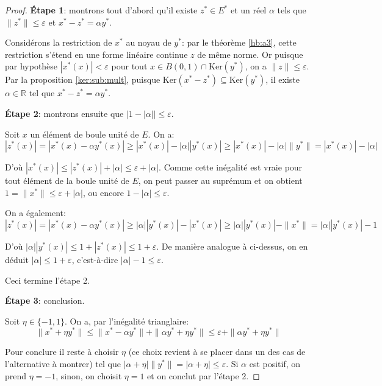 \begin{proof}
  \textbf{\'{E}tape 1}:
  montrons tout d'abord qu'il existe $z^*\in E^*$ et un réel $\alpha$ tels
  que $\|z^*\|\leq \varepsilon$ et $x^* - z^* = \alpha y^*$.

  Considérons la restriction de $x^*$ au noyau de $y^*$: par le
  théorème \ref{hb:a3}, cette restriction s'étend en une forme linéaire
  continue $z$ de même norme.
  Or puisque par hypothèse $|x^*(x)| < \varepsilon$ pour tout $x\in B(0, 1)
  \cap \mathrm{Ker}(y^*)$, on a $\|z\|\leq \varepsilon$. Par la proposition
  \ref{ker:sub:mult}, puisque $\mathrm{Ker}(x^* - z^*) \subseteq
  \mathrm{Ker}(y^*)$, il existe $\alpha \in\mathbb{R}$ tel que $x^*-z^* =
  \alpha y^*$.

  \textbf{\'{E}tape 2}: montrons ensuite que $|1- |\alpha||\leq \varepsilon$.


  Soit $x$ un élément de boule unité de $E$. On a:
  $$|z^*(x)| = |x^*(x)-\alpha y^*(x)| \geq |x^*(x)| - |\alpha||y^*(x)|
  \geq |x^*(x)| - |\alpha| \|y^*\| = |x^*(x)| - |\alpha|$$

  D'où $|x^*(x)| \leq |z^*(x)| + |\alpha|\leq \varepsilon + |\alpha|$.
  Comme cette inégalité est vraie pour tout élément de la boule unité de $E$,
  on peut passer au suprémum et on obtient $1 = \|x^*\|\leq \varepsilon
  + |\alpha|$, ou encore $ 1 - |\alpha| \leq \varepsilon$.

  On a également:
   $$|z^*(x)| = |x^*(x)-\alpha y^*(x)| \geq |\alpha||y^*(x)| -|x^*(x)|
   \geq |\alpha| |y^*(x)| - \|x^*\| = |\alpha||y^*(x)| - 1$$

   D'où $|\alpha| |y^*(x)| \leq 1 + |z^*(x)|\leq 1 + \varepsilon$. De manière
   analogue à ci-dessus, on en déduit $|\alpha| \leq 1 + \varepsilon$,
   c'est-à-dire $|\alpha| - 1\leq \varepsilon$.

   Ceci termine l'étape 2.

   \textbf{\'{E}tape 3}: conclusion.

   Soit $\eta \in\{-1, 1\}$. On a, par l'inégalité trianglaire:
   $$\|x^*+ \eta y^*\| \leq \|x^* - \alpha y^*\| + \|\alpha y^* + \eta y^*\|
   \leq \varepsilon + \|\alpha y^* + \eta y^*\|$$

   Pour conclure il reste à choisir $\eta$ (ce choix revient à se
   placer dans un des cas de l'alternative à montrer) tel que
   $|\alpha + \eta| \|y^*\|= |\alpha + \eta| \leq \varepsilon$.
   Si $\alpha$ est positif, on prend  $\eta = -1$, sinon, on choisit
   $\eta = 1$ et on conclut par l'étape 2.
\end{proof}

